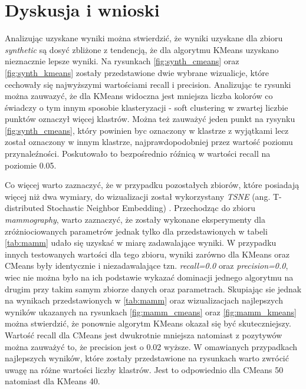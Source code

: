 \documentclass{classrep}
\begin{document}
    \section{Dyskusja i wnioski} {
        Analizując uzyskane wyniki można stwierdzić, że wyniki uzyskane dla zbioru
        \textit{synthetic} są dosyć zbliżone z tendencją, że dla algorytmu KMeans
        uzyskano nieznacznie lepsze wyniki. Na rysunkach \ref{fig:synth_cmeans} oraz
        \ref{fig:synth_kmeans} zostały przedstawione dwie wybrane wizualicje, które
        cechowały się najwyższymi wartościami recall i precision. Analizując te rysunki
        można zauwazyć, że dla KMeans widoczna jest mniejsza liczba kolorów co świadczy
        o tym innym sposobie klasteryzacji - soft clustering w zwartej liczbie punktów
        oznaczył więcej klastrów. Można też zauważyć jeden punkt na rysynku
        \ref{fig:synth_cmeans}, który powinien byc oznaczony w klastrze z wyjątkami
        lecz został oznaczony w innym klastrze, najprawdopodobniej przez wartość poziomu
        przynaleźności. Poskutowało to bezpośrednio róźnicą w wartości recall na
        poziomie 0.05.

        Co więcej warto zaznaczyć, że w przypadku pozostałych zbiorów, które posiadają
        więcej niż dwa wymiary, do wizualizacji został wykorzystany \textit{TSNE}
        (ang. T-distributed Stochastic Neighbor Embedding) \cite{tsne}. Przechodząc do
        zbioru \textit{mammography}, warto zaznaczyć, że zostały wykonane eksperymenty dla
        zróżniociowanych parametrów jednak tylko dla przedstawionych w tabeli
        \ref{tab:mamm} udało się uzyskać w miarę zadawalające wyniki. W przypadku
        innych testowanych wartości dla tego zbioru, wyniki zarówno dla KMeans oraz
        CMeans były identycznie i niezadawalające tzn. \textit{recall=0.0} oraz
        \textit{precision=0.0}, wiec nie można było na ich podstawie wykazać dominacji
        jednego algorytmu na drugim przy takim samym zbiorze danych oraz parametrach.
        Skupiając sie jednak na wynikach przedstawionych w \ref{tab:mamm} oraz
        wizualizacjach najlepszych wyników ukazanych na rysunkach \ref{fig:mamm_cmeans}
        oraz \ref{fig:mamm_kmeans} można stwierdzić, że ponownie algorytm KMeans okazał
        się być skuteczniejszy. Wartość recall dla CMeans jest dwukrotnie mniejsza
        natomiast z pozytywów można zauważyć to, że precision jest o 0.02 wyższe. W
        omawianych przypadkach najlepszych wyników, które zostały przedstawione na
        rysunkach warto zwrócić uwagę na różne wartości liczby klastrów. Jest to
        odpowiednio dla CMeans 50 natomiast dla KMeans 40.

}
\end{document}
